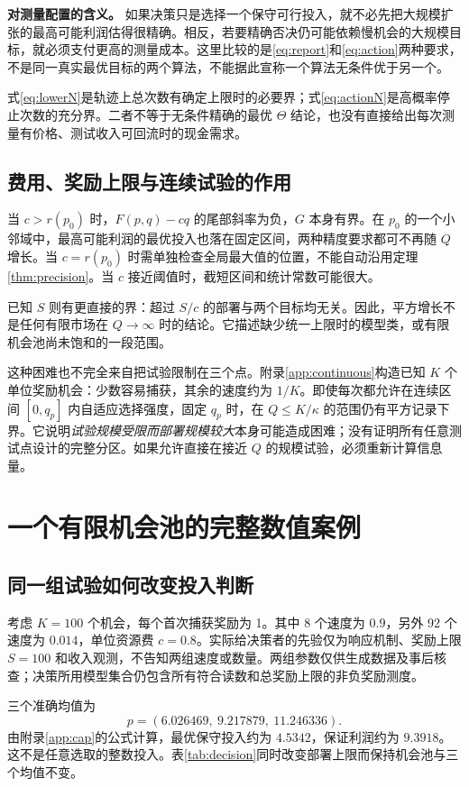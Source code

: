\noindent\textbf{对测量配置的含义。}
如果决策只是选择一个保守可行投入，就不必先把大规模扩张的最高可能利润估得很精确。相反，若要精确否决仍可能依赖慢机会的大规模目标，就必须支付更高的测量成本。这里比较的是\eqref{eq:report}和\eqref{eq:action}两种要求，不是同一真实最优目标的两个算法，不能据此宣称一个算法无条件优于另一个。

式\eqref{eq:lowerN}是轨迹上总次数有确定上限时的必要界；式\eqref{eq:actionN}是高概率停止次数的充分界。二者不等于无条件精确的最优 $\Theta$ 结论，也没有直接给出每次测量有价格、测试收入可回流时的现金需求。

\subsection{费用、奖励上限与连续试验的作用}
当 $c>r(p_0)$ 时，$F(p,q)-cq$ 的尾部斜率为负，$G$ 本身有界。在 $p_0$ 的一个小邻域中，最高可能利润的最优投入也落在固定区间，两种精度要求都可不再随 $Q$ 增长。当 $c=r(p_0)$ 时需单独检查全局最大值的位置，不能自动沿用定理\ref{thm:precision}。当 $c$ 接近阈值时，截短区间和统计常数可能很大。

已知 $S$ 则有更直接的界：超过 $S/c$ 的部署与两个目标均无关。因此，平方增长不是任何有限市场在 $Q\to\infty$ 时的结论。它描述缺少统一上限时的模型类，或有限机会池尚未饱和的一段范围。

这种困难也不完全来自把试验限制在三个点。附录\ref{app:continuous}构造已知 $K$ 个单位奖励机会：少数容易捕获，其余的速度约为 $1/K$。即使每次都允许在连续区间 $[0,q_p]$ 内自适应选择强度，固定 $q_p$ 时，在 $Q\leq K/\kappa$ 的范围仍有平方记录下界。它说明\emph{试验规模受限而部署规模较大}本身可能造成困难；没有证明所有任意测试点设计的完整分区。如果允许直接在接近 $Q$ 的规模试验，必须重新计算信息量。

\section{一个有限机会池的完整数值案例}\label{sec:numerics}
\subsection{同一组试验如何改变投入判断}
考虑 $K=100$ 个机会，每个首次捕获奖励为 1。其中 8 个速度为 $0.9$，另外 92 个速度为 $0.014$，单位资源费 $c=0.8$。实际给决策者的先验仅为响应机制、奖励上限 $S=100$ 和收入观测，不告知两组速度或数量。两组参数仅供生成数据及事后核查；决策所用模型集合仍包含所有符合读数和总奖励上限的非负奖励测度。

三个准确均值为
\[
 p=(6.026469,\ 9.217879,\ 11.246336).
\]
由附录\ref{app:cap}的公式计算，最优保守投入约为 $4.5342$，保证利润约为 $9.3918$。这不是任意选取的整数投入。表\ref{tab:decision}同时改变部署上限而保持机会池与三个均值不变。

